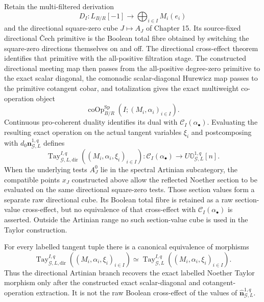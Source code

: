 \begin{construction}
\label{constr:symmetry-noether-directional-artinian-cross-effect-and-exact-multilinearization}
Retain the multi-filtered derivation
\[
D_I:
L_{B/R}[-1]
\longrightarrow
\bigoplus_{i\in I}M_i(e_i)
\]
and the directional square-zero cube $J\mapsto A_J$ of Chapter 15.  Its
source-fixed directional \v{C}ech primitive is the Boolean total fibre obtained by
switching the square-zero directions themselves on and off.  The directional
cross-effect theorem identifies that primitive with the all-positive filtration
stage.  The constructed directional meeting map then passes from the all-positive
degree-zero primitive to the exact scalar diagonal, the comonadic scalar-diagonal
Hurewicz map passes to the primitive cotangent cobar, and totalization gives the
exact multiweight co-operation object
\[
\operatorname{coOp}^{\mathrm{Sp}}_{B/R}
\left(I;(M_i,\alpha_i)_{i\in I}\right).
\]
Continuous pro-coherent duality identifies its dual with
$\mathcal C_I(\alpha_\bullet)$.  Evaluating the resulting exact operation on the
actual tangent variables $\xi_i$ and postcomposing with
$d_0\mathbf n_{\mathcal G,L}^{1,q}$ defines
\[
\boxed{
\operatorname{Tay}^{I,q}_{\mathcal G,L,\mathrm{dir}}
\left((M_i,\alpha_i,\xi_i)_{i\in I}\right):
\mathcal C_I(\alpha_\bullet)
\longrightarrow
U\mathbb O_{\mathcal G,L}^{1,q}[n].
}
\]
When the underlying tests $A_J^{0}$ lie in the spectral Artinian subcategory, the
compatible points $x_J$ constructed above allow the reflected Noether section to be
evaluated on the same directional square-zero tests.  Those section values form a
separate raw directional cube.  Its Boolean total fibre is retained as a raw
section-value cross-effect, but no equivalence of that cross-effect with
$\mathcal C_I(\alpha_\bullet)$ is asserted.  Outside the Artinian range no such
section-value cube is used in the Taylor construction.
\end{construction}

\begin{theorem}
\label{thm:symmetry-noether-directional-recognition-of-the-exact-taylor-class}
For every labelled tangent tuple there is a canonical equivalence of morphisms
\[
\boxed{
\operatorname{Tay}^{I,q}_{\mathcal G,L,\mathrm{dir}}
\left((M_i,\alpha_i,\xi_i)_{i\in I}\right)
\simeq
\operatorname{Tay}_{\mathcal G,L}^{I,q}
\left((M_i,\alpha_i,\xi_i)_{i\in I}\right).
}
\]
Thus the directional Artinian branch recovers the exact labelled Noether Taylor
morphism only after the constructed exact scalar-diagonal and cotangent-operation
extraction.  It is not the raw Boolean cross-effect of the values of
$\widehat{\mathbf n}_{\mathcal G,L}^{1,q}$.
\end{theorem}


